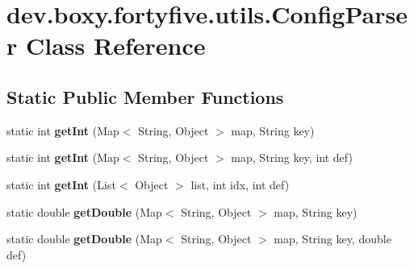 \hypertarget{classdev_1_1boxy_1_1fortyfive_1_1utils_1_1_config_parser}{
\section{dev.boxy.fortyfive.utils.ConfigParser Class Reference}
\label{db/d92/classdev_1_1boxy_1_1fortyfive_1_1utils_1_1_config_parser}
}
\subsection*{Static Public Member Functions}
\begin{DoxyCompactItemize}
\item 
\hypertarget{classdev_1_1boxy_1_1fortyfive_1_1utils_1_1_config_parser_a7db40cee865112a33d7f7e47a513e847}{
static int {\bfseries getInt} (Map$<$ String, Object $>$ map, String key)}
\label{db/d92/classdev_1_1boxy_1_1fortyfive_1_1utils_1_1_config_parser_a7db40cee865112a33d7f7e47a513e847}

\item 
\hypertarget{classdev_1_1boxy_1_1fortyfive_1_1utils_1_1_config_parser_a4b923c7adae62467a87587bb1961cf0f}{
static int {\bfseries getInt} (Map$<$ String, Object $>$ map, String key, int def)}
\label{db/d92/classdev_1_1boxy_1_1fortyfive_1_1utils_1_1_config_parser_a4b923c7adae62467a87587bb1961cf0f}

\item 
\hypertarget{classdev_1_1boxy_1_1fortyfive_1_1utils_1_1_config_parser_a3d56c7be1746a09d85ac0e2811bce2cf}{
static int {\bfseries getInt} (List$<$ Object $>$ list, int idx, int def)}
\label{db/d92/classdev_1_1boxy_1_1fortyfive_1_1utils_1_1_config_parser_a3d56c7be1746a09d85ac0e2811bce2cf}

\item 
\hypertarget{classdev_1_1boxy_1_1fortyfive_1_1utils_1_1_config_parser_acf640ae2ab25b2676cf3be190d306ded}{
static double {\bfseries getDouble} (Map$<$ String, Object $>$ map, String key)}
\label{db/d92/classdev_1_1boxy_1_1fortyfive_1_1utils_1_1_config_parser_acf640ae2ab25b2676cf3be190d306ded}

\item 
\hypertarget{classdev_1_1boxy_1_1fortyfive_1_1utils_1_1_config_parser_a707701afd4cc9b243d48c74fcc7fbb65}{
static double {\bfseries getDouble} (Map$<$ String, Object $>$ map, String key, double def)}
\label{db/d92/classdev_1_1boxy_1_1fortyfive_1_1utils_1_1_config_parser_a707701afd4cc9b243d48c74fcc7fbb65}


\end{DoxyCompactItemize}
